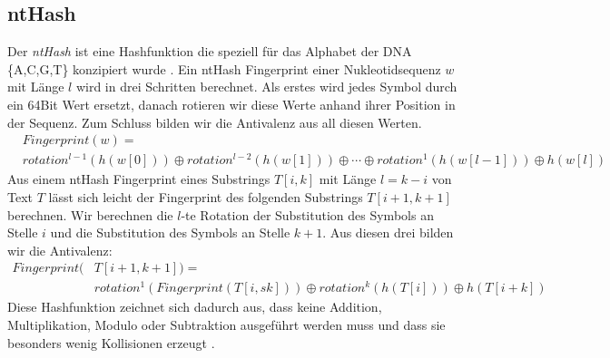 \subsection{ntHash}
Der \textit{ntHash} ist eine Hashfunktion die speziell für das Alphabet der DNA \{A,C,G,T\} konzipiert wurde \cite{nthhash}.
Ein ntHash Fingerprint einer Nukleotidsequenz $w$ mit Länge $l$ wird in drei Schritten berechnet. Als erstes wird jedes Symbol durch ein 64Bit Wert ersetzt, danach rotieren wir diese Werte anhand ihrer Position in der Sequenz.
Zum Schluss bilden wir die Antivalenz aus all diesen Werten.
\begin{align} 
	&Fingerprint(w)=\nonumber \\
	& rotation^{l-1}(h(w[0]))\oplus rotation^{l-2}(h(w[1]))\oplus\cdots
	 \oplus rotation^{1}(h(w[l-1]))\oplus h(w[l])\nonumber
\end{align}
Aus einem ntHash Fingerprint eines Substrings $T[i, k]$ mit Länge $l=k-i$ von Text $T$  lässt sich leicht der Fingerprint des folgenden Substrings $T[i+1, k+1]$ berechnen.
Wir berechnen die $l$-te Rotation der Substitution des Symbols an Stelle $i$ und die Substitution des Symbols an Stelle $k+1$. Aus diesen drei bilden wir die Antivalenz:
\begin{align}
	Fingerprint(&T[i+1, k+1])= \nonumber \\ 
	&rotation^1(Fingerprint(T[i,s k]))\oplus rotation^k(h(T[i]))\oplus h(T[i+k])\nonumber
\end{align}
Diese Hashfunktion zeichnet sich dadurch aus, dass keine Addition, Multiplikation, Modulo oder Subtraktion ausgeführt werden muss und dass sie besonders wenig Kollisionen erzeugt \cite{nthhash}.